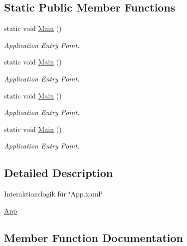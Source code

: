 \subsection*{Static Public Member Functions}
\begin{DoxyCompactItemize}
\item 
static void \hyperlink{class_rowing_monitor_1_1_app_a3cb5b8569d044cd9687827e6c2072b7e}{Main} ()
\begin{DoxyCompactList}\small\item\em Application Entry Point. \end{DoxyCompactList}\item 
static void \hyperlink{class_rowing_monitor_1_1_app_a3cb5b8569d044cd9687827e6c2072b7e}{Main} ()
\begin{DoxyCompactList}\small\item\em Application Entry Point. \end{DoxyCompactList}\item 
static void \hyperlink{class_rowing_monitor_1_1_app_a3cb5b8569d044cd9687827e6c2072b7e}{Main} ()
\begin{DoxyCompactList}\small\item\em Application Entry Point. \end{DoxyCompactList}\item 
static void \hyperlink{class_rowing_monitor_1_1_app_a3cb5b8569d044cd9687827e6c2072b7e}{Main} ()
\begin{DoxyCompactList}\small\item\em Application Entry Point. \end{DoxyCompactList}\end{DoxyCompactItemize}


\subsection{Detailed Description}
Interaktionslogik für \char`\"{}\+App.\+xaml\char`\"{} 

\hyperlink{class_rowing_monitor_1_1_app}{App} 

\subsection{Member Function Documentation}
\mbox{\label{class_rowing_monitor_1_1_app_a92cbce86d55626b5b411b795ec66c0c2}} 
